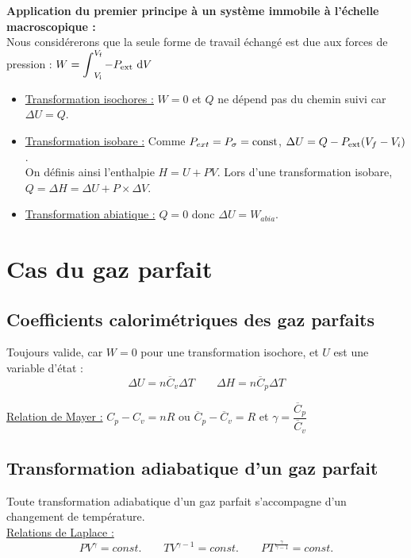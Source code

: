 \documentclass[13pt, twoside, a4paper, french]{report}
\begin{document}
            \textbf{Application du premier principe à un système immobile à l'échelle macroscopique :}
            \vspace{4pt}\\
            Nous considérerons que la seule forme de travail échangé est due aux forces de pression : $W = \operatorname{\displaystyle\int}^{V_\textrm{f}}_{V_\textrm{i}} - P_\textrm{ext}\ \textrm dV$
            \vspace{4pt}
            \begin{itemize}
                \item \underline{Transformation isochores :} $W = 0$ et $Q$ ne dépend pas du chemin suivi car $\Delta U = Q$.
                \vspace{4pt}
                \item \underline{Transformation isobare :} Comme $P_{ext} = P_\sigma = \textrm{const}$, $\Delta U = Q - P_\textrm{ext} (V_f - V_i)$.\\
                On définis ainsi l'enthalpie $H = U + PV$.
                Lors d'une transformation isobare, $Q = \Delta H = \Delta U + P \times \Delta V$.
                \vspace{4pt}
                \item \underline{Transformation abiatique :} $Q = 0$ donc $\Delta U = W_{abia}$.
            \end{itemize}


        \section{Cas du gaz parfait}\label{sec:cas-du-gaz-parfait}

            \subsection{Coefficients calorimétriques des gaz parfaits}\label{subsec:coefficients-calorimetriques-des-gaz-parfaits}

                Toujours valide, car $W = 0$ pour une transformation isochore, et $U$ est une variable d'état :
                \[\Delta U = n \overline{C}_v \Delta T \quad\quad \Delta H = n \overline{C}_p \Delta T\]

                \underline{Relation de Mayer :} $C_p - C_v = nR$ ou $\overline{C}_p - \overline{C}_v= R$ et $\gamma = \dfrac{\overline{C}_p}{\overline{C}_v}$

            \subsection{Transformation adiabatique d'un gaz parfait}\label{subsec:transformation-adiabatique-d'un-gaz-parfait}
                Toute transformation adiabatique d’un gaz parfait s’accompagne d’un changement de température.\\
                \underline{Relations de Laplace :}
                \[P V^\gamma = const. \quad\quad T V^{\gamma - 1} = const. \quad\quad P T^\frac{\gamma}{\gamma - 1} = const. \]
\end{document}
